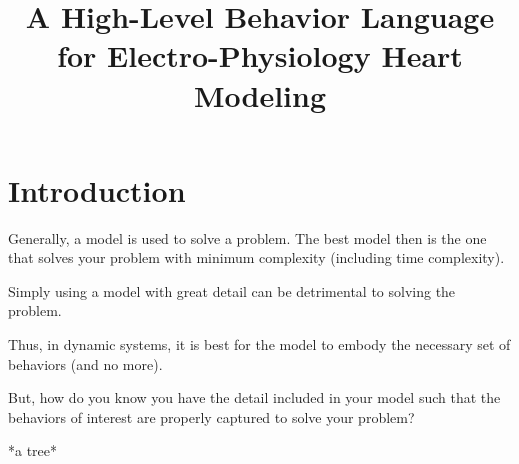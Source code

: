 \documentclass{llncs}
\begin{document}
%
\frontmatter          %
%
\pagestyle{headings}  %
%
%
\title{A High-Level Behavior Language for Electro-Physiology Heart Modeling}

\maketitle              %
\vspace{-10pt}



        
\section{Introduction}

Generally, a model is used to solve a problem. The best model then is the one that solves your problem with minimum complexity (including time complexity).

Simply using a model with great detail can be detrimental to solving the problem.

Thus, in dynamic systems, it is best for the model to embody the necessary set of behaviors (and no more). 

But, how do you know you have the detail included in your model such that the behaviors of interest are properly captured to solve your problem?

*a tree*
\end{document}
